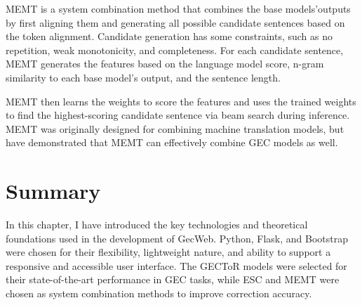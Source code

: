 MEMT is a system combination method that combines the base models'outputs by first aligning
them and generating all possible candidate sentences based on the token alignment.
Candidate generation has some constraints, such as no repetition, weak monotonicity, and completeness.
For each candidate sentence, MEMT generates the features based on the language model score, n-gram
similarity to each base model's output, and the sentence length.

MEMT then learns the weights to score the features and uses the trained weights to find the highest-scoring candidate sentence via beam search during inference.
MEMT was originally designed for combining machine translation models, but \cite{ng-etal-2014-conll} have demonstrated that MEMT can effectively combine GEC models as well.

\section{Summary}
\label{summary}

In this chapter, I have introduced the key technologies and theoretical foundations used in the development of GecWeb.
Python, Flask, and Bootstrap were chosen for their flexibility, lightweight nature, and ability to support a responsive and accessible user interface.
The GECToR models were selected for their state-of-the-art performance in GEC tasks, while ESC and MEMT were chosen as system combination methods to improve correction accuracy.
